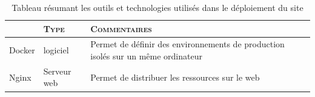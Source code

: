 			
			\begin{table}[!ht]
				\centering
				\begin{tabular}[pos]{ | b | m{} | m{} |}
					\rowcolor{lightgray}
					
					& \textbf{\textsc{\large{Type}}} & \textbf{\textsc{\large{Commentaires}}}\\
					\hline
					Docker & logiciel & Permet de d\'efinir des environnements de production isol\'es sur un m\^eme ordinateur\\
					\hline
					Nginx & Serveur web & Permet de distribuer les ressources sur le web\\
					\hline
					\hline
				\end{tabular}
				\caption{Tableau r\'esumant les outils et technologies utilis\'es dans le d\'eploiement du site}
				\label{TabTechDeploiement}
			\end{table}